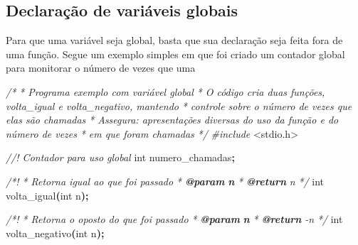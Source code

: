 \documentclass[
  11pt,
  a4paper,
]{scrbook}
\newenvironment{Shaded}{\begin{snugshade}}{\end{snugshade}}
\newcommand{\AnnotationTok}[1]{\textcolor[rgb]{0.56,0.35,0.01}{\textbf{\textit{#1}}}}
\newcommand{\CommentTok}[1]{\textcolor[rgb]{0.56,0.35,0.01}{\textit{#1}}}
\newcommand{\CommentVarTok}[1]{\textcolor[rgb]{0.56,0.35,0.01}{\textbf{\textit{#1}}}}
\newcommand{\DataTypeTok}[1]{\textcolor[rgb]{0.13,0.29,0.53}{#1}}
\newcommand{\ImportTok}[1]{#1}
\newcommand{\NormalTok}[1]{#1}
\newcommand{\OperatorTok}[1]{\textcolor[rgb]{0.81,0.36,0.00}{\textbf{#1}}}
\newcommand{\PreprocessorTok}[1]{\textcolor[rgb]{0.56,0.35,0.01}{\textit{#1}}}
\begin{document}
\subsection{Declaração de variáveis
globais}\label{declarauxe7uxe3o-de-variuxe1veis-globais}

Para que uma variável seja global, basta que sua declaração seja feita
fora de uma função. Segue um exemplo simples em que foi criado um
contador global para monitorar o número de vezes que uma

\begin{Shaded}
\begin{Highlighting}[]
\CommentTok{/*}
\CommentTok{ * Programa exemplo com variável global}
\CommentTok{ * O código cria duas funções, volta\_igual e volta\_negativo, mantendo}
\CommentTok{ *      controle sobre o número de vezes que elas são chamadas}
\CommentTok{ * Assegura: apresentações diversas do uso da função e do número de vezes}
\CommentTok{ *      em que foram chamadas}
\CommentTok{ */}
\PreprocessorTok{\#include }\ImportTok{\textless{}stdio.h\textgreater{}}

\CommentTok{//! Contador para uso global}
\DataTypeTok{int}\NormalTok{ numero\_chamadas}\OperatorTok{;}

\CommentTok{/*!}
\CommentTok{ * Retorna igual ao que foi passado}
\CommentTok{ * }\AnnotationTok{@param}\CommentTok{ }\CommentVarTok{n}
\CommentTok{ * }\AnnotationTok{@return}\CommentTok{ n}
\CommentTok{ */}
\DataTypeTok{int}\NormalTok{ volta\_igual}\OperatorTok{(}\DataTypeTok{int}\NormalTok{ n}\OperatorTok{);}

\CommentTok{/*!}
\CommentTok{ * Retorna o oposto do que foi passado}
\CommentTok{ * }\AnnotationTok{@param}\CommentTok{ }\CommentVarTok{n}
\CommentTok{ * }\AnnotationTok{@return}\CommentTok{ {-}n}
\CommentTok{ */}
\DataTypeTok{int}\NormalTok{ volta\_negativo}\OperatorTok{(}\DataTypeTok{int}\NormalTok{ n}\OperatorTok{);}


\end{Highlighting}
\end{Shaded}
\end{document}
